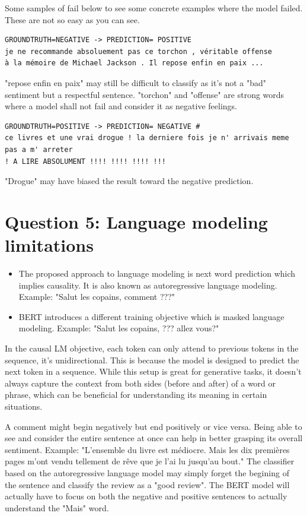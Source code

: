 \documentclass[a4paper]{article}
\begin{document}
Some samples of fail below to see some concrete examples where the model failed. These are not so easy as you can see.
\begin{verbatim}
GROUNDTRUTH=NEGATIVE -> PREDICTION= POSITIVE
je ne recommande absoluement pas ce torchon , véritable offense 
à la mémoire de Michael Jackson . Il repose enfin en paix ...
\end{verbatim}
"repose enfin en paix" may still be difficult to classify as it's not a "bad" sentiment but a respectful sentence.
"torchon" and "offense" are strong words where a model shall not fail and consider it as negative feelings.

\begin{verbatim}
GROUNDTRUTH=POSITIVE -> PREDICTION= NEGATIVE #
ce livres et une vrai drogue ! la derniere fois je n' arrivais meme pas a m' arreter 
! A LIRE ABSOLUMENT !!!! !!!! !!!! !!!
\end{verbatim}
"Drogue" may have biased the result toward the negative prediction.



\section{Question 5: Language modeling limitations}
\begin{itemize}
\item The proposed approach to language modeling is next word prediction which implies causality. It is also known as autoregressive language modeling.
Example: "Salut les copains, comment ???"
\item BERT \cite{devlin2019bert} introduces a different training objective which is masked language modeling. 
Example: "Salut les copains, ??? allez vous?"
\end{itemize}

In the causal LM objective, each token can only attend to previous tokens in the sequence, it's unidirectional. 
This is because the model is designed to predict the next token in a sequence. 
While this setup is great for generative tasks, it doesn't always capture the context from both sides (before and after) 
of a word or phrase, which can be beneficial for understanding its meaning in certain situations.

A comment might begin negatively but end positively or vice versa. Being able to see and consider the entire sentence at once can help in better grasping its overall sentiment.
Example: "L'ensemble du livre est médiocre. Mais les dix premières pages m'ont vendu tellement de rêve que je l'ai lu jusqu'au bout."
The classifier based on the autoregressive language model may simply forget the begining of the sentence and classify the review as a "good review".
The BERT model will actually have to focus on both the negative and positive sentences to actually understand the "Mais" word.
\end{document}
